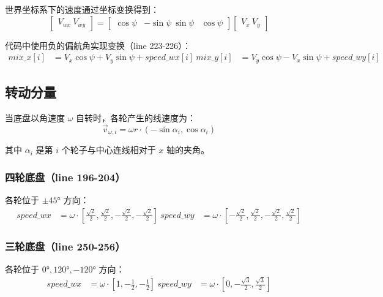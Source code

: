 \documentclass[12pt,a4paper]{article}
\begin{document}
世界坐标系下的速度通过坐标变换得到：
\begin{equation}
\begin{bmatrix} V_{wx} \ V_{wy} \end{bmatrix} =
\begin{bmatrix}
\cos\psi & -\sin\psi \
\sin\psi & \cos\psi
\end{bmatrix}
\begin{bmatrix} V_x \ V_y \end{bmatrix}
\end{equation}

代码中使用负的偏航角实现变换（line 223-226）：
\begin{align}
mix\_x[i] &= V_x \cos\psi + V_y \sin\psi + speed\_wx[i] \
mix\_y[i] &= V_y \cos\psi - V_x \sin\psi + speed\_wy[i]
\end{align}

\subsection{转动分量}
当底盘以角速度 $\omega$ 自转时，各轮产生的线速度为：
\begin{equation}
\vec{v}_{\omega,i} = \omega r \cdot (-\sin\alpha_i, \cos\alpha_i)
\end{equation}

其中 $\alpha_i$ 是第 $i$ 个轮子与中心连线相对于 $x$ 轴的夹角。

\subsubsection{四轮底盘（line 196-204）}
各轮位于 $\pm 45°$ 方向：
\begin{align}
speed\_wx &= \omega \cdot \left[\frac{\sqrt{2}}{2}, \frac{\sqrt{2}}{2}, -\frac{\sqrt{2}}{2}, -\frac{\sqrt{2}}{2}\right] \
speed\_wy &= \omega \cdot \left[-\frac{\sqrt{2}}{2}, \frac{\sqrt{2}}{2}, -\frac{\sqrt{2}}{2}, \frac{\sqrt{2}}{2}\right]
\end{align}

\subsubsection{三轮底盘（line 250-256）}
各轮位于 $0°, 120°, -120°$ 方向：
\begin{align}
speed\_wx &= \omega \cdot \left[1, -\frac{1}{2}, -\frac{1}{2}\right] \
speed\_wy &= \omega \cdot \left[0, -\frac{\sqrt{3}}{2}, \frac{\sqrt{3}}{2}\right]
\end{align}
\end{document}
